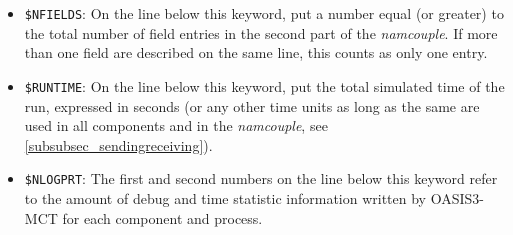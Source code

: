 \begin{itemize}

\item {\tt \$NFIELDS}: On the line below this keyword, put a number equal (or greater) to the total
  number of field entries in the second part of the {\it
    namcouple}. If more than one field are described on the same line, this
  counts as only one entry.

%

\item {\tt \$RUNTIME}: On the line below this keyword, put the total
  simulated time of the run, expressed in seconds (or any other time
  units as long as the same are used in all components and in the {\it
    namcouple}, see \ref{subsubsec_sendingreceiving}).
 
\item {\tt \$NLOGPRT}: The first and second numbers on the line below
  this keyword refer to the amount of debug and time statistic
  information written by OASIS3-MCT for each component and process.


\end{itemize}
